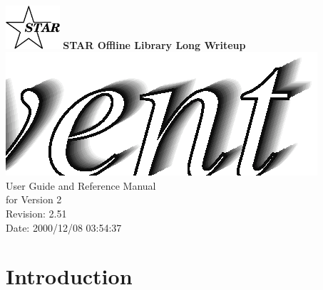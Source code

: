 \documentclass[twoside]{article}
\begin{document}
%
%
\begin{titlepage}
\pagestyle{empty}
\vspace*{-25mm}
\begin{center}
  \mbox{\includegraphics[width=2cm]{StarIcon.eps}}
  {\Large\bf STAR Offline Library Long Writeup}
  \hfill\mbox{}\\[3cm]
  \mbox{\includegraphics[width=\textwidth]{StEventTitle.eps}}
  \hfill\mbox{}\\[3cm]
  {\LARGE User Guide and Reference Manual \\[5mm] for Version 2}\\[2cm]
  {\LARGE $ $Revision: 2.51 $ $}  \\[5mm] %
  {\LARGE $ $Date: 2000/12/08 03:54:37 $ $}  %
  \vfill
\end{center}
\cleardoublepage
\end{titlepage}

%
%
\tableofcontents
\cleardoublepage

%
%

\section{Introduction} %
\end{document}

